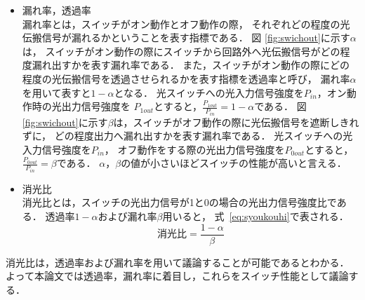 \begin{itemize}
\item 漏れ率，透過率\\
漏れ率とは，スイッチがオン動作とオフ動作の際，
それぞれどの程度の光伝搬信号が漏れるかということを表す指標である．
図 \ref{fig:swichout}に示す$\alpha $は，
スイッチがオン動作の際にスイッチから回路外へ光伝搬信号がどの程度漏れ出すかを表す漏れ率である．
また，スイッチがオン動作の際にどの程度の光伝搬信号を透過させられるかを表す指標を透過率と呼び，
漏れ率$\alpha$を用いて表すと$1- \alpha$となる．
光スイッチへの光入力信号強度を$P_{in}$，オン動作時の光出力信号強度を
$P_{1out}$とすると，$\frac{P_{1out}}{P_{in}}=1- \alpha$である．
図 \ref{fig:swichout}に示す$\beta $は，スイッチがオフ動作の際に光伝搬信号を遮断しきれずに，
どの程度出力へ漏れ出すかを表す漏れ率である．
光スイッチへの光入力信号強度を$P_{in}$，
オフ動作をする際の光出力信号強度を$P_{0out}$とすると，
$\frac{P_{0out}}{P_{in}}=\beta$である．
$\alpha $，$ \beta $の値が小さいほどスイッチの性能が高いと言える．
\item 消光比\\
消光比とは，スイッチの光出力信号が1と0の場合の光出力信号強度比である．
透過率$1- \alpha$および漏れ率$\beta $用いると，
式~\eqref{eq:syoukouhi}で表される．
\begin{equation}
消光比= \frac{1- \alpha}{\beta}
\label{eq:syoukouhi}
\end{equation}
\end{itemize}

消光比は，透過率および漏れ率を用いて議論することが可能であるとわかる．
よって本論文では透過率，漏れ率に着目し，これらをスイッチ性能として議論する．


